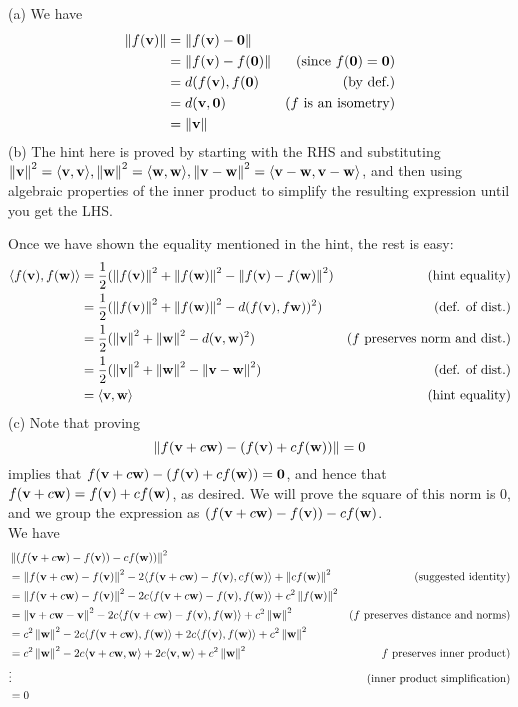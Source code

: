 \begin{solution}
\noindent
(a) We have 
\begin{align*}
\left\lVert f({\mathbf v})\right\rVert&=\left\lVert f({\mathbf v})-{\mathbf 0}\right\rVert\\
&=\left\lVert f({\mathbf v})-f({\mathbf 0})\right\rVert &\text{(since $f({\mathbf 0})={\mathbf 0}$)}\\
&=d(f({\mathbf v}),f({\mathbf 0}) &\text{(by def.)}\\
&=d({\mathbf v}, {\mathbf 0}) &\text{($f$ is an isometry)}\\
&=\left\lVert{\mathbf v}\right\rVert
\end{align*}
(b) The hint here is proved by starting with the RHS and substituting $\left\lVert{\mathbf v}\right\rVert^2=\langle {\mathbf v}, {\mathbf v}\rangle, \left\lVert{\mathbf w}\right\rVert^2=\langle {\mathbf w},{\mathbf w}\rangle, \left\lVert{\mathbf v}-{\mathbf w}\right\rVert^2=\langle {\mathbf v}-{\mathbf w},{\mathbf v}-{\mathbf w}\rangle$, and then using algebraic properties of the inner product to simplify the resulting expression until you get the LHS. 

Once we have shown the equality mentioned in the hint, the rest is easy:
\begin{align*}
\langle f({\mathbf v}),f({\mathbf w})\rangle&=\frac{1}{2}(\left\lVert f({\mathbf v})\right\rVert^2+\left\lVert f({\mathbf w})\right\rVert^2-\left\lVert f({\mathbf v})-f({\mathbf w})\right\rVert^2) &\text{(hint equality)}\\
&=\frac{1}{2}(\left\lVert f({\mathbf v})\right\rVert^2+\left\lVert f({\mathbf w})\right\rVert^2-d(f({\mathbf v}), f{\mathbf w}))^2) &\text{(def. of dist.)}\\
&=\frac{1}{2}(\left\lVert{\mathbf v}\right\rVert^2+\left\lVert{\mathbf w}\right\rVert^2-d({\mathbf v}, {\mathbf w})^2) &\text{($f$ preserves norm and dist.)}\\
&=\frac{1}{2}(\left\lVert{\mathbf v}\right\rVert^2+\left\lVert{\mathbf w}\right\rVert^2-\left\lVert{\mathbf v}-{\mathbf w}\right\rVert^2) &\text{(def. of dist.)}\\
&=\langle {\mathbf v},{\mathbf w}\rangle &\text{(hint equality)}
\end{align*}
(c) Note that proving 
\[
\left\lVert f({\mathbf v}+c{\mathbf w})-(f({\mathbf v})+cf({\mathbf w}))\right\rVert=0
\]
implies that $f({\mathbf v}+c{\mathbf w})-(f({\mathbf v})+cf({\mathbf w}))={\mathbf 0}$, and hence that $f({\mathbf v}+c{\mathbf w})=f({\mathbf v})+cf({\mathbf w})$, as desired. We will prove the square of this norm is 0, and we group the expression as $(f({\mathbf v}+c{\mathbf w})-f({\mathbf v}))-cf({\mathbf w})$. 
\\
We have
\begin{align*}
&\left\lVert\left(f({\mathbf v}+c{\mathbf w})-f({\mathbf v})\right)-cf({\mathbf w}))\right\rVert^2\\
&=\left\lVert f({\mathbf v}+c{\mathbf w})-f({\mathbf v})\right\rVert^2-2\langle f({\mathbf v}+c{\mathbf w})-f({\mathbf v}),cf({\mathbf w})\rangle+\left\lVert cf({\mathbf w})\right\rVert^2 &\text{(suggested identity)}\\
&=\left\lVert f({\mathbf v}+c{\mathbf w})-f({\mathbf v})\right\rVert^2-2c\langle f({\mathbf v}+c{\mathbf w})-f({\mathbf v}),f({\mathbf w})\rangle+c^2\left\lVert f({\mathbf w})\right\rVert^2 \\
&=\left\lVert{\mathbf v}+c{\mathbf w}- {\mathbf v}\right\rVert^2-2c\langle f({\mathbf v}+c{\mathbf w})-f({\mathbf v}),f({\mathbf w})\rangle+c^2\left\lVert{\mathbf w}\right\rVert^2 &\text{($f$ preserves distance and norms)}\\
&=c^2\left\lVert{\mathbf w}\right\rVert^2-2c\langle f({\mathbf v}+c{\mathbf w}),f({\mathbf w})\rangle+2c\langle f({\mathbf v}),f({\mathbf w})\rangle+c^2\left\lVert{\mathbf w}\right\rVert^2\\
&=c^2\left\lVert{\mathbf w}\right\rVert^2-2c\langle {\mathbf v}+c{\mathbf w},{\mathbf w}\rangle+2c\langle {\mathbf v}, {\mathbf w}\rangle +c^2\left\lVert{\mathbf w}\right\rVert^2 &\text{$f$ preserves inner product)}\\
&\vdots &\text{(inner product simplification)}\\
&=0
\end{align*}
\end{solution}
\ee
